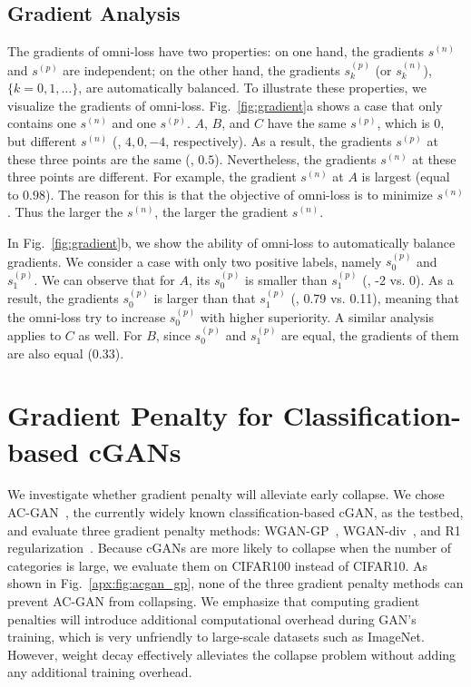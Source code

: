 \documentclass[paper_2425.tex]{subfiles}
\begin{document}
\subsection{Gradient Analysis}
\label{sec:gradients}

The gradients of omni-loss have two properties: on one hand, the gradients \wrt $s^{(n)}$ and $s^{(p)}$ are independent; on the other hand, the gradients \wrt $s^{(p)}_{k}$ (or $s^{(n)}_k$), $\{k=0,1,\dots\}$, are automatically balanced. To illustrate these properties, we visualize the gradients of omni-loss. Fig.~\ref{fig:gradient}a shows a case that only contains one $s^{(n)}$ and one $s^{(p)}$. $A$, $B$, and $C$ have the same $s^{(p)}$, which is $0$, but different $s^{(n)}$ (\ie, $4, 0, -4$, respectively). As a result, the gradients \wrt $s^{(p)}$ at these three points are the same (\ie, $0.5$). Nevertheless, the gradients \wrt $s^{(n)}$ at these three points are different. For example, the gradient \wrt $s^{(n)}$ at $A$ is largest (equal to $0.98$).  The reason for this is that the objective of omni-loss is to minimize $s^{(n)}$. Thus the larger the $s^{(n)}$, the larger the gradient \wrt $s^{(n)}$.

In Fig.~\ref{fig:gradient}b, we show the ability of omni-loss to automatically balance gradients. We consider a case with only two positive labels, namely $s^{(p)}_0$ and $s^{(p)}_1$. We can observe that for $A$, its $s^{(p)}_0$ is smaller than $s^{(p)}_1$ (\ie, -2 vs. 0). As a result, the gradients \wrt $s^{(p)}_0$ is larger than that \wrt $s^{(p)}_1$ (\ie, 0.79 vs. 0.11), meaning that the omni-loss try to increase $s^{(p)}_0$ with higher superiority. A similar analysis applies to $C$ as well. For $B$, since $s^{(p)}_0$ and $s^{(p)}_1$ are equal, the gradients of them are also equal ($0.33$).


\section{Gradient Penalty for Classification-based cGANs}
\label{apx:sec:gp}

We investigate whether gradient penalty will alleviate early collapse. We chose AC-GAN~\cite{odena2017Conditional}, the currently widely known classification-based cGAN, as the testbed, and evaluate three gradient penalty methods: WGAN-GP~\cite{gulrajani2017Improved}, WGAN-div~\cite{mescheder2018Which}, and R1 regularization~\cite{wu2018Wasserstein}. Because cGANs are more likely to collapse when the number of categories is large, we evaluate them on CIFAR100 instead of CIFAR10. As shown in Fig.~\ref{apx:fig:acgan_gp}, none of the three gradient penalty methods can prevent AC-GAN from collapsing. We emphasize that computing gradient penalties will introduce additional computational overhead during GAN's training, which is very unfriendly to large-scale datasets such as ImageNet. However, weight decay effectively alleviates the collapse problem without adding any additional training overhead.
\end{document}
